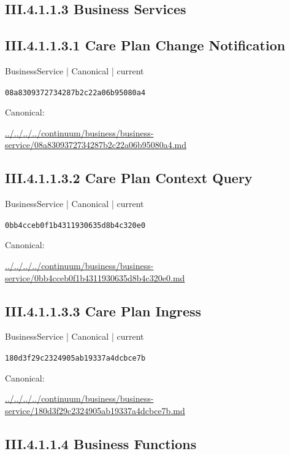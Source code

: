 \documentclass[10pt,a4paper]{article}
\begin{document}
\subsection*{III.4.1.1.3 Business Services}
\subsection*{III.4.1.1.3.1 Care Plan Change Notification}
\label{element-08a8309372734287b2c22a06b95080a4}
{\small BusinessService | Canonical | current}\par
\texttt{08a8309372734287b2c22a06b95080a4}\par
Canonical: \par
{\footnotesize\url{../../../../continuum/business/business-service/08a8309372734287b2c22a06b95080a4.md}}\par
\subsection*{III.4.1.1.3.2 Care Plan Context Query}
\label{element-0bb4cceb0f1b4311930635d8b4c320e0}
{\small BusinessService | Canonical | current}\par
\texttt{0bb4cceb0f1b4311930635d8b4c320e0}\par
Canonical: \par
{\footnotesize\url{../../../../continuum/business/business-service/0bb4cceb0f1b4311930635d8b4c320e0.md}}\par
\subsection*{III.4.1.1.3.3 Care Plan Ingress}
\label{element-180d3f29c2324905ab19337a4dcbce7b}
{\small BusinessService | Canonical | current}\par
\texttt{180d3f29c2324905ab19337a4dcbce7b}\par
Canonical: \par
{\footnotesize\url{../../../../continuum/business/business-service/180d3f29c2324905ab19337a4dcbce7b.md}}\par
\subsection*{III.4.1.1.4 Business Functions}
\end{document}
